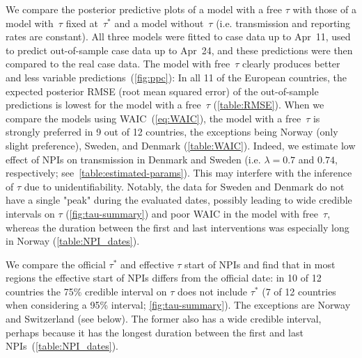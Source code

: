 \documentclass[12pt]{extarticle}
\begin{document}
We compare the posterior predictive plots of a model with a free $\tau$ with those of a model with~$\tau$ fixed at~$\tau^*$ and a model without~$\tau$ (i.e. transmission and reporting rates are constant).
All three models were fitted to case data up to Apr~11, used to predict out-of-sample case data up to Apr~24, and these predictions were then compared to the real case data. 
The model with free~$\tau$ clearly produces better and less variable predictions~(\autoref{fig:ppc}):
In all 11 of the European countries, the expected posterior RMSE (root mean squared error) of the out-of-sample predictions is lowest for the model with a free~$\tau$ (\autoref{table:RMSE}).
When we compare the models using WAIC~(\autoref{eq:WAIC}), the model with a free~$\tau$ is strongly preferred in 9 out of 12 countries, the exceptions being Norway (only slight preference), Sweden, and Denmark (\autoref{table:WAIC}).
Indeed, we estimate low effect of NPIs on transmission in Denmark and Sweden (i.e. $\lambda=0.7$ and $0.74$, respectively; see~\autoref{table:estimated-params}).
This may interfere with the inference of $\tau$ due to unidentifiability. 
Notably, the data for Sweden and Denmark do not have a single "peak" during the evaluated dates, possibly leading to wide credible intervals on $\tau$ (\autoref{fig:tau-summary}) and poor WAIC in the model with free~$\tau$, whereas the duration between the first and last interventions was especially long in Norway (\autoref{table:NPI_dates}).

We compare the official $\tau^*$ and effective $\tau$ start of NPIs and find that in most regions the effective start of NPIs differs from the official date: in 10 of 12 countries the 75\% credible interval on $\tau$ does not include $\tau^*$ (7 of 12 countries when considering a 95\% interval; \autoref{fig:tau-summary}).
The exceptions are Norway and Switzerland (see below).
The former also has a wide credible interval, perhaps because it has the longest duration between the first and last NPIs~(\autoref{table:NPI_dates}).
\end{document}
